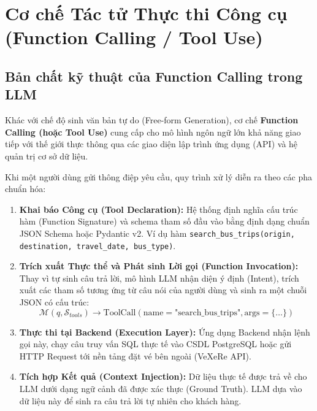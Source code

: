 \section{Cơ chế Tác tử Thực thi Công cụ (Function Calling / Tool Use)}

\subsection{Bản chất kỹ thuật của Function Calling trong LLM}
Khác với chế độ sinh văn bản tự do (Free-form Generation), cơ chế \textbf{Function Calling (hoặc Tool Use)} cung cấp cho mô hình ngôn ngữ lớn khả năng giao tiếp với thế giới thực thông qua các giao diện lập trình ứng dụng (API) và hệ quản trị cơ sở dữ liệu.

Khi một người dùng gửi thông điệp yêu cầu, quy trình xử lý diễn ra theo các pha chuẩn hóa:
\begin{enumerate}
    \item \textbf{Khai báo Công cụ (Tool Declaration):} Hệ thống định nghĩa cấu trúc hàm (Function Signature) và schema tham số đầu vào bằng định dạng chuẩn JSON Schema hoặc Pydantic v2. Ví dụ hàm \texttt{search\_bus\_trips(origin, destination, travel\_date, bus\_type)}.
    \item \textbf{Trích xuất Thực thể và Phát sinh Lời gọi (Function Invocation):} Thay vì tự sinh câu trả lời, mô hình LLM nhận diện ý định (Intent), trích xuất các tham số tương ứng từ câu nói của người dùng và sinh ra một chuỗi JSON có cấu trúc:
    \begin{equation}
        \mathcal{M}(q, \mathcal{S}_{tools}) \rightarrow \text{ToolCall}(\text{name}=\text{"search\_bus\_trips"}, \text{args}=\{\dots\})
    \end{equation}
    \item \textbf{Thực thi tại Backend (Execution Layer):} Ứng dụng Backend nhận lệnh gọi này, chạy câu truy vấn SQL thực tế vào CSDL PostgreSQL hoặc gửi HTTP Request tới nền tảng đặt vé bên ngoài (VeXeRe API).
    \item \textbf{Tích hợp Kết quả (Context Injection):} Dữ liệu thực tế được trả về cho LLM dưới dạng ngữ cảnh đã được xác thực (Ground Truth). LLM dựa vào dữ liệu này để sinh ra câu trả lời tự nhiên cho khách hàng.
\end{enumerate}

